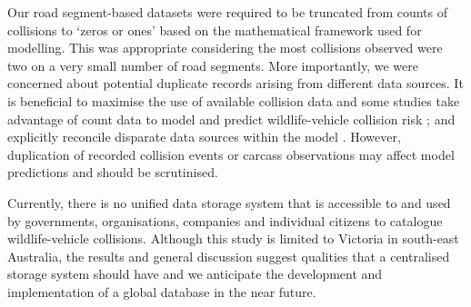 Our road segment-based datasets were required to be truncated from counts of collisions to `zeros or ones' based on the mathematical framework used for modelling. This was appropriate considering the most collisions observed were two on a very small number of road segments. More importantly, we were concerned about potential duplicate records arising from different data sources. It is beneficial to maximise the use of available collision data and some studies take advantage of count data to model and predict wildlife-vehicle collision risk \citep{cser13}; and explicitly reconcile disparate data sources within the model \citep{lao11a}. However, duplication of recorded collision events or carcass observations may affect model predictions and should be scrutinised.

Currently, there is no unified data storage system that is accessible to and used by governments, organisations, companies and individual citizens to catalogue wildlife-vehicle collisions. Although this study is limited to Victoria in south-east Australia, the results and general discussion suggest qualities that a centralised storage system should have and we anticipate the development and implementation of a global database in the near future.
